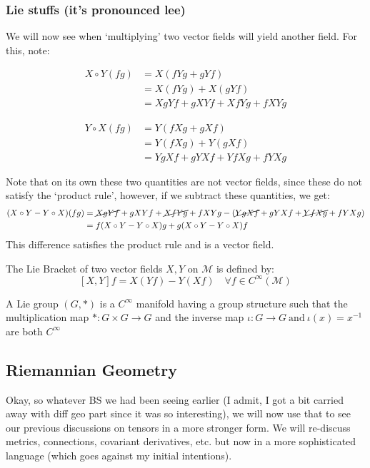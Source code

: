 \subsubsection{Lie stuffs (it's pronounced lee)}
We will now see when `multiplying' two vector fields will yield another field. For this, note:
\begin{minipage}{0.48\textwidth}
\begin{align*}
  X \circ Y (fg) &= X(fYg + gYf) \\
                 &= X(fYg) + X(gYf) \\
                 &= XgYf + gXYf + XfYg + fXYg
\end{align*}
\end{minipage}
\hfill
\begin{minipage}{0.48\textwidth}
\begin{align*}
  Y \circ X (fg) &= Y(fXg + gXf) \\
                 &= Y(fXg) + Y(gXf) \\
                 &= YgXf + gYXf + YfXg + fYXg
\end{align*}
\end{minipage}
Note that on its own these two quantities are not vector fields, since these do not satisfy the `product rule', however, if we subtract these quantities, we get:
  \begin{align*}
    (X\circ Y - Y\circ X)(fg) &=\cancel{XgYf} + gXYf + \cancel{XfYg} + fXYg - (\cancel{YgXf} + gYXf + \cancel{YfXg} + fYXg)\\
    &= f(X\circ Y - Y\circ X)g +g(X\circ Y - Y\circ X)f
  \end{align*}
  This difference satisfies the product rule and is a vector field.
\begin{definition}
  The Lie Bracket of two vector fields $X,Y$ on $\mathcal{M}$ is defined by:
  $$[X,Y]f = X(Yf) - Y(Xf) \quad \forall f\in C^\infty(\mathcal{M})$$
\end{definition}
\begin{definition}
A Lie group $(G, *)$ is a $C^\infty$ manifold having a group structure such that the multiplication map $* : G \times G\rightarrow  G$ and the inverse map $\iota: G\rightarrow G \ \text{and} \ \iota(x) = x^{-1}$ are both $C^\infty$
\end{definition}
\subsection{Riemannian Geometry}
Okay, so whatever BS we had been seeing earlier (I admit, I got a bit carried away with diff geo part since it was so interesting), we will now use that to see our previous discussions on tensors in a more stronger form. We will re-discuss metrics, connections, covariant derivatives, etc. but now in a more sophisticated language (which goes against my initial intentions). 

% 

